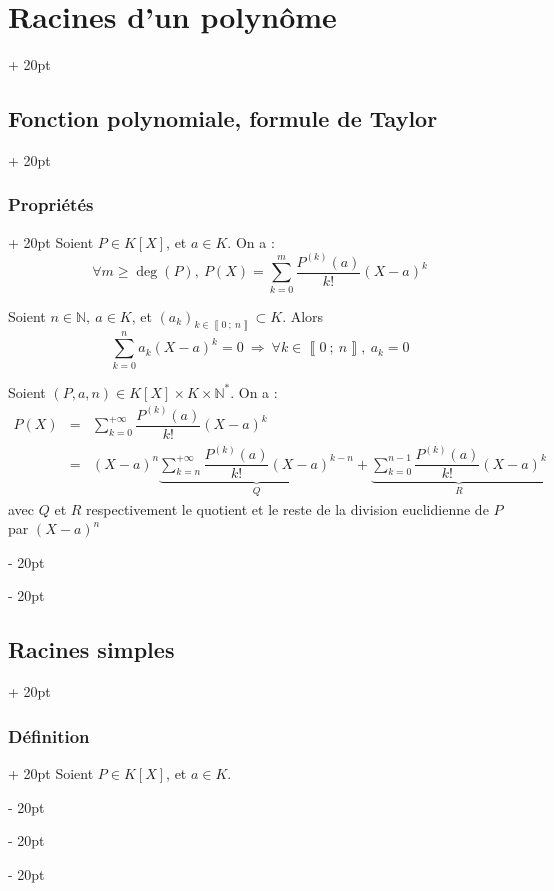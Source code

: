 \documentclass[a4paper, 12pt, twoside]{article}
\newcommand{\N}{\mathbb{N}} %
\newcommand{\nset}[2]{\left\llbracket #1\ ;\ #2 \right\rrbracket}
\renewcommand{\ge}{\geqslant}
\newcommand{\ind}[1][20pt]{\advance\leftskip + #1}
\newcommand{\deind}[1][20pt]{\advance\leftskip - #1}
\newenvironment{indt}[2][20pt]{#2 \par \ind[#1]}{\par \deind} %
\begin{document}
\begin{indt}{\section{Racines d'un polynôme}}
\begin{indt}{\subsection{Fonction polynomiale, formule de Taylor}}
            \vspace{6pt}
            
            \begin{indt}{\subsubsection{Propriétés}}
                Soient $P \in K[X]$, et $a \in K$. On a :
                    \[ \forall m \ge \deg(P),\ P(X) = \sum_{k = 0}^m \dfrac{P^{(k)}(a)}{k!} (X - a)^k \]
                
                \vspace{6pt}
                
                Soient $n \in \N,\ a \in K$, et $(a_k)_{k \in \nset 0 n} \subset K$. Alors
                    \[ \sum_{k = 0}^n a_k(X - a)^k = 0\ \Rightarrow\ \forall k \in \nset 0 n,\ a_k = 0 \]
                
                \vspace{6pt}
                
                Soient $(P, a, n) \in K[X] \times K \times \N^*$. On a : %
                    \[\begin{array}{rcl}
                        P(X)
                        &=& \displaystyle \sum_{k = 0}^{+\infty} \dfrac{P^{(k)}(a)}{k!} (X - a)^k
                        \\
                        &=& \displaystyle
                        (X - a)^n \underbrace{\sum_{k = n}^{+\infty} \dfrac{P^{(k)}(a)}{k!} (X - a)^{k - n}}_{Q}
                        +
                        \underbrace{\sum_{k = 0}^{n - 1} \dfrac{P^{(k)}(a)}{k!} (X - a)^k}_{R}
                    \end{array}\]
                avec $Q$ et $R$ respectivement le quotient et le reste de la division euclidienne de $P$ par $(X - a)^n$
            \end{indt}
        \end{indt}
        
        \vspace{12pt}
        
        \begin{indt}{\subsection{Racines simples}}
            \begin{indt}{\subsubsection{Définition}}
                Soient $P \in K[X]$, et $a \in K$.
                

\end{indt}
\end{indt}
\end{indt}
\end{document}
